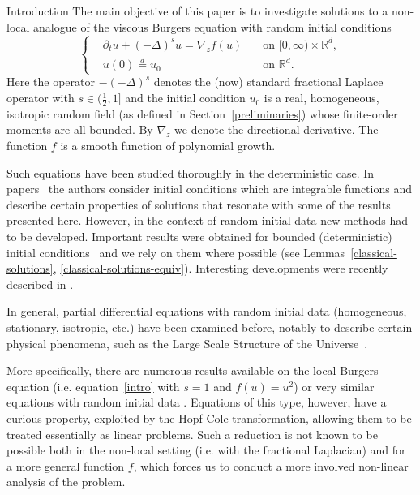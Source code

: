 \documentclass[a4paper,10pt,fleqn]{amsart}
\theoremstyle{remark}
\theoremstyle{definition}
\newcommand{\dt} {\partial_t}
\newcommand{\grad} {\nabla_{\!z}}
\newcommand{\X} {{\mathbb{R}^d}}
\newcommand{\T} {[0,\infty)}
\renewcommand{\=} {\overset{d}{=}}
\newcommand{\fLap} {(-\Delta)^s}
\begin{document}
  \begin{section}{Introduction}
   The main objective of this paper is to investigate solutions to a non-local
   analogue of the viscous Burgers equation with random initial conditions
      \begin{equation}\label{intro}
      \left\{
      \begin{aligned}
        &\dt u + \fLap u = \grad f(u)\quad&\text{on $\T\times\X$}, \\
        &u(0) \= u_0\quad&\text{on $\X$}.
      \end{aligned}
      \right.
    \end{equation}
   Here the operator $-\fLap$ denotes the (now) standard fractional Laplace operator
   with $s\in(\frac{1}{2},1]$
   and the initial condition $u_0$ is a real, homogeneous, isotropic random field (as defined in Section~\ref{preliminaries})
   whose finite-order moments are all bounded.
   By $\grad$ we denote the directional derivative. The function $f$ is a smooth function of polynomial growth.
   
   Such equations have been studied thoroughly in the deterministic case. In papers~\cite{MR1708995,MR1881259,MR1849690} the authors consider
   initial conditions which are integrable functions and describe certain properties of solutions that resonate
   with some of the results presented here. However, in the context of random initial data new
   methods had to be developed. Important results were obtained for bounded (deterministic) initial conditions~\cite{MR2019032}
   and we rely on them where possible (see Lemmas~\ref{classical-solutions}, \ref{classical-solutions-equiv}).
   Interesting developments were recently described in \cite{2017arXiv170302908I}.
   
   In general, partial differential equations with random initial data (homogeneous, stationary, isotropic, etc.) have been
   examined before, notably to describe certain physical phenomena, such
   as the Large Scale Structure of the Universe~\cite{MR1305783, MR1732301, MannJr.2001}.
   
   More specifically, there are numerous results available on the local Burgers equation (i.e. equation~\eqref{intro} with $s=1$ and $f(u)=u^2$) or very similar equations with random initial data
   \cite{MR1859007,MR1939652,MR1978661,MR1687092,MR1642664}. Equations of this type, however, have a curious property, exploited by the Hopf-Cole transformation, allowing them to be treated essentially as linear problems. Such a reduction is not known to be possible
   both in the non-local setting (i.e. with the fractional Laplacian) and for a more general
   function $f$, 
   which forces us to conduct a more involved non-linear analysis of the problem. 
   

\end{section}
\end{document}

